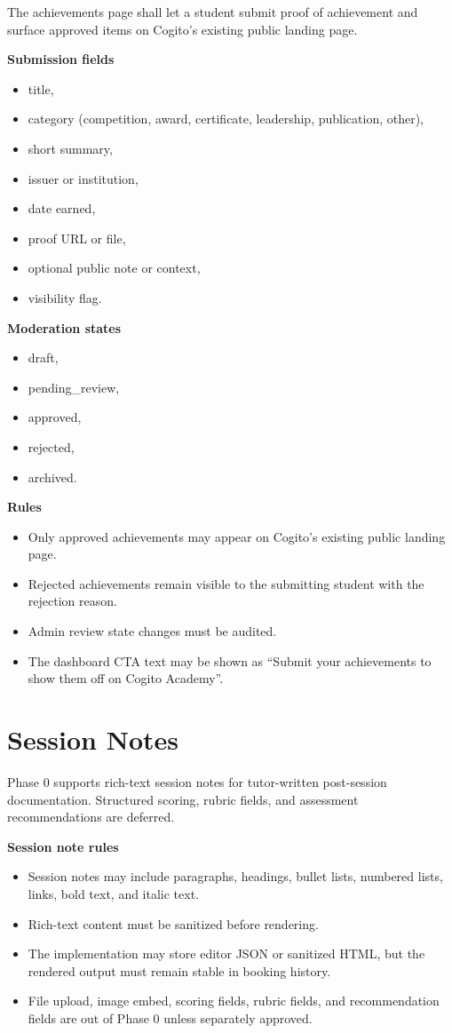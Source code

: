\documentclass[11pt,a4paper]{article}
\begin{document}
The achievements page shall let a student submit proof of achievement and surface approved items on Cogito's existing public landing page.

\textbf{Submission fields}
\begin{itemize}
	\item title,
	\item category (competition, award, certificate, leadership, publication, other),
	\item short summary,
	\item issuer or institution,
	\item date earned,
	\item proof URL or file,
	\item optional public note or context,
	\item visibility flag.
\end{itemize}

\textbf{Moderation states}
\begin{itemize}
	\item draft,
	\item pending\_review,
	\item approved,
	\item rejected,
	\item archived.
\end{itemize}

\textbf{Rules}
\begin{itemize}
	\item Only approved achievements may appear on Cogito's existing public landing page.
	\item Rejected achievements remain visible to the submitting student with the rejection reason.
	\item Admin review state changes must be audited.
	\item The dashboard CTA text may be shown as ``Submit your achievements to show them off on Cogito Academy''.
\end{itemize}

\section{Session Notes}

Phase 0 supports rich-text session notes for tutor-written post-session documentation. Structured scoring, rubric fields, and assessment recommendations are deferred.

\textbf{Session note rules}
\begin{itemize}
    \item Session notes may include paragraphs, headings, bullet lists, numbered lists, links, bold text, and italic text.
    \item Rich-text content must be sanitized before rendering.
    \item The implementation may store editor JSON or sanitized HTML, but the rendered output must remain stable in booking history.
    \item File upload, image embed, scoring fields, rubric fields, and recommendation fields are out of Phase 0 unless separately approved.
\end{itemize}
\end{document}
